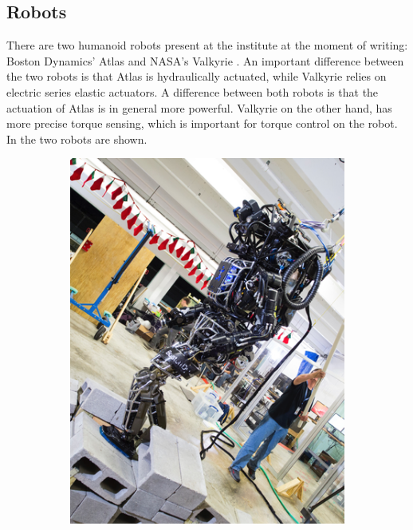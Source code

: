 \subsection{Robots}
There are two humanoid robots present at the institute at the moment of writing: Boston Dynamics' Atlas and NASA's Valkyrie \cite{radford2015valkyrie}. An important difference between the two robots is that Atlas is hydraulically actuated, while Valkyrie relies on electric series elastic actuators. A difference between both robots is that the actuation of Atlas is in general more powerful. Valkyrie on the other hand, has more precise torque sensing, which is important for torque control on the robot. In  the two robots are shown.
\begin{figure}[h]
\centering
  \begin{subfigure}{0.45\textwidth}
  \centering
  \includegraphics[width=.8\linewidth]{STYLESTUFF/AtlasOld.png}
   \caption{}
    \label{fig:atlas}
  \end{subfigure}
  \begin{subfigure}{0.45\textwidth}
    \centering

\end{subfigure}
\end{figure}
